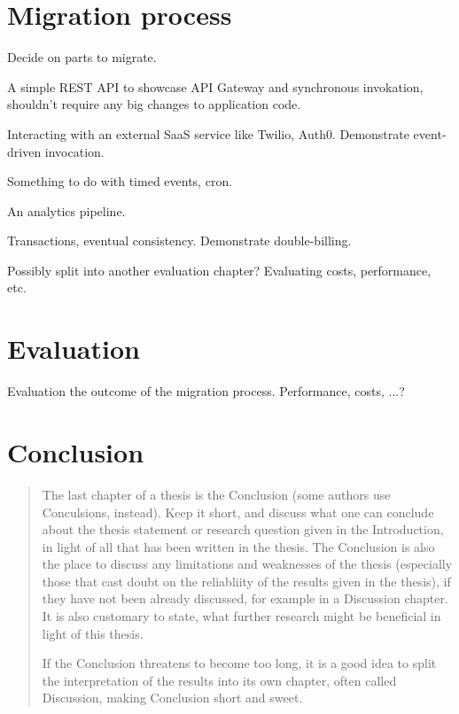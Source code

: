 \documentclass[utf8,english]{gradu3}
\begin{document}
\chapter{Migration process}

Decide on parts to migrate.

A simple REST API to showcase API Gateway and synchronous invokation, shouldn't require any big changes to application code.

Interacting with an external SaaS service like Twilio, Auth0. Demonstrate event-driven invocation.

Something to do with timed events, cron.

An analytics pipeline.

Transactions, eventual consistency. Demonstrate double-billing.

Possibly split into another evaluation chapter? Evaluating costs, performance, etc.

\chapter{Evaluation}

Evaluation the outcome of the migration process. Performance, costs, ...?

\chapter{Conclusion}

\begin{quote}
The last chapter of a thesis is the Conclusion (some authors use
Conculsions, instead).  Keep it short, and discuss what one can
conclude about the thesis statement or research question given in the
Introduction, in light of all that has been written in the thesis.
The Conclusion is also the place to discuss any limitations and
weaknesses of the thesis (especially those that cast doubt on the
reliabliity of the results given in the thesis), if they have not been
already discussed, for example in a Discussion chapter.  It is also
customary to state, what further research might be beneficial in light
of this thesis.

If the Conclusion threatens to become too long, it is a good idea to
split the interpretation of the results into its own chapter, often
called Discussion, making Conclusion short and sweet.
\end{quote}

\printbibliography
\end{document}
